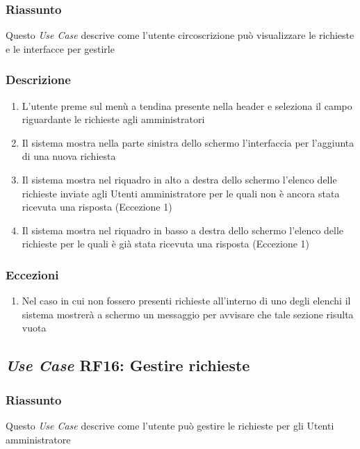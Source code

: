         \subsubsection{Riassunto}
            Questo \textit{Use Case} descrive come l'utente circoscrizione può visualizzare le richieste e le interfacce per gestirle
        \subsubsection{Descrizione}
            \begin{enumerate}
                \item L'utente preme sul menù a tendina presente nella header e seleziona il campo riguardante le richieste agli amministratori
                \item Il sistema mostra nella parte sinistra dello schermo l'interfaccia per l'aggiunta di una nuova richiesta
                \item Il sistema mostra nel riquadro in alto a destra dello schermo l'elenco delle richieste inviate agli Utenti amministratore per le quali non è ancora stata ricevuta una risposta (Eccezione 1)
                \item Il sistema mostra nel riquadro in basso a destra dello schermo l'elenco delle richieste per le quali è già stata ricevuta una risposta (Eccezione 1)
            \end{enumerate}
        \subsubsection{Eccezioni}
            \begin{enumerate}
                \item Nel caso in cui non fossero presenti richieste all'interno di uno degli elenchi il sistema mostrerà a schermo un messaggio per avvisare che tale sezione risulta vuota
            \end{enumerate}

    \subsection{\textit{Use Case} RF16: Gestire richieste}
        \subsubsection{Riassunto}
            Questo \textit{Use Case} descrive come l'utente può gestire le richieste per gli Utenti amministratore
